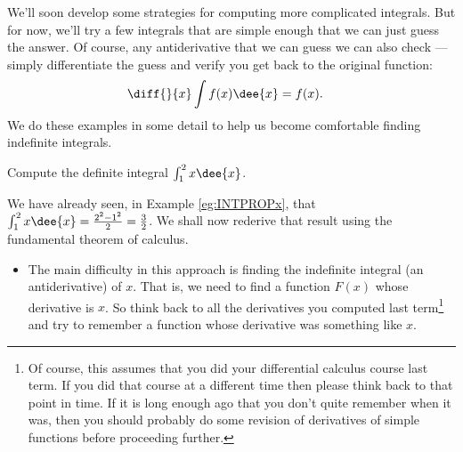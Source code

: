 We'll soon develop some strategies for computing more complicated integrals.
But for now, we'll try a few integrals that are simple enough that we can
just guess the answer. Of course, any antiderivative that we can guess we can also check
--- simply differentiate the guess and verify you get back to the original function:
\begin{align*}
  \diff{}{x} \int f(x)\dee{x} &= f(x).
\end{align*}
We do these examples in some detail to help us become comfortable finding indefinite
integrals.
\begin{eg}\label{eg:INTintegralA}
Compute the definite integral $\int_1^2 x\dee{x}$.

\soln We have already seen, in Example \ref{eg:INTPROPx}, that
$\int_1^2 x\dee{x}=\frac{2^2-1^2}{2}=\frac{3}{2}$. We shall now
rederive that result using the fundamental theorem of calculus.
\begin{itemize}
 \item The main difficulty in this approach is finding the indefinite integral (an
antiderivative) of $x$. That is, we need to find a function $F(x)$ whose derivative is
$x$. So think back to all the derivatives you computed last term\footnote{Of course, this
assumes that you did your differential calculus course last term. If you did that course
at a different time then please think back to that point in time. If it is long enough
ago that you don't quite remember when it was, then you should probably do some revision
of derivatives of simple functions before proceeding further.} and try to remember a
function whose derivative was something like $x$.


\end{itemize}
\end{eg}
